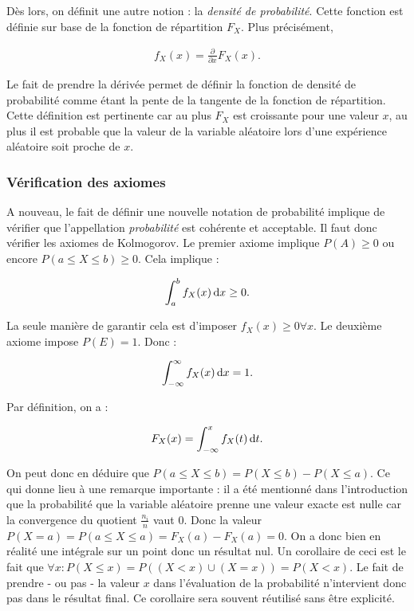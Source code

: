 \documentclass{article}
\renewcommand{\pd}[1]{\frac {\partial}{\partial #1}}
\begin{document}
		Dès lors, on définit une autre notion : la \textit{densité de probabilité}. Cette fonction est définie sur base de la fonction de répartition $F_X$. Plus précisément,

		\begin{align}
			f_X(x) = \pd{x}F_X(x).
		\end{align}

		Le fait de prendre la dérivée permet de définir la fonction de densité de probabilité comme étant la pente de la tangente de la fonction de répartition. Cette définition
		est pertinente car au plus $F_X$ est croissante pour une valeur $x$, au plus il est probable que la valeur de la variable aléatoire lors d'une expérience aléatoire soit
		proche de $x$.

		\subsubsection{Vérification des axiomes}
			A nouveau, le fait de définir une nouvelle notation de probabilité implique de vérifier que l'appellation \textit{probabilité} est cohérente et acceptable.
			Il faut donc vérifier les axiomes de Kolmogorov. Le premier axiome implique $P(A) \geq 0$ ou encore $P(a \leq X \leq b) \geq 0$.
			Cela implique :

			\[\int_a^bf_X(x)\dif x \geq 0.\]

			La seule manière de garantir cela est d'imposer $f_X(x) \geq 0 \forall x$. Le deuxième axiome impose $P(E) = 1$. Donc :

			\[\int_{-\infty}^\infty f_X(x)\dif x = 1.\]

			Par définition, on a :

			\begin{align}
				F_X(x) = \int_{-\infty}^xf_X(t)\dif t.
			\end{align}

			On peut donc en déduire que $P(a \leq X \leq b) = P(X \leq b) - P(X \leq a)$. Ce qui donne lieu à une remarque importante : il a été mentionné dans l'introduction
			que la probabilité que la variable aléatoire prenne une valeur exacte est nulle car la convergence du quotient $\frac {n_i}n$ vaut $0$. Donc la valeur
			$P(X = a) = P(a \leq X \leq a) = F_X(a) - F_X(a) = 0$. On a donc bien en réalité une intégrale sur un point donc un résultat nul. Un corollaire de ceci est le fait
			que $\forall x : P(X \leq x) = P((X < x) \cup (X = x)) = P(X < x)$. Le fait de prendre - ou pas - la valeur $x$ dans l'évaluation de la probabilité n'intervient
			donc pas dans le résultat final. Ce corollaire sera souvent réutilisé sans être explicité.
\end{document}
